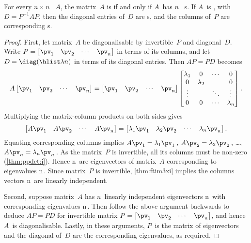 \begin{theorem} \label{thm:gendiag} 
For every \(n\times n\) ~\(A\), the matrix~\(A\) is  if and only if \(A\)~has \(n\)~ s.  
If \(A\)~is , with  \(D=P^{-1}AP\), then  the diagonal entries of~\(D\) are s, and the columns of~\(P\) are corresponding s.
\end{theorem}
\begin{proof} 
First, let matrix~\(A\) be diagonalisable by invertible~\(P\) and diagonal~\(D\).
Write \(P=\begin{bmatrix} \pv_1&\pv_2&\cdots&\pv_n \end{bmatrix}\) in terms of its columns, and let \(D=\diag(\hlist\lambda n)\) in terms of its diagonal entries.
Then \(AP=PD\) becomes
\begin{equation*}
A\begin{bmatrix} \pv_1&\pv_2&\cdots&\pv_n \end{bmatrix}
=\begin{bmatrix} \pv_1&\pv_2&\cdots&\pv_n \end{bmatrix}
\begin{bmatrix} \lambda_1&0&\cdots&0\\
0&\lambda_2&&0\\
\vdots&&\ddots&\vdots\\
0&0&\cdots&\lambda_n \end{bmatrix}.
\end{equation*}
Multiplying the matrix-column products on both sides gives
\begin{equation*}
\begin{bmatrix} A\pv_1&A\pv_2&\cdots&A\pv_n \end{bmatrix}
=\begin{bmatrix} \lambda_1\pv_1& \lambda_2\pv_2&\cdots& \lambda_n\pv_n \end{bmatrix}.
\end{equation*}
Equating corresponding columns implies \(A\pv_1=\lambda_1\pv_1\)\,, \(A\pv_2=\lambda_2\pv_2\)\,, \ldots, \(A\pv_n=\lambda_n\pv_n\)\,.
As the matrix~\(P\) is invertible, all its columns must be non-zero (\autoref{thm:ppdet:i}).
Hence \hlist\pv n\ are eigenvectors of matrix~\(A\) corresponding to eigenvalues \hlist\lambda n\,.
Since matrix~\(P\) is invertible, \autoref{thm:ftim3xi} implies the columns vectors \hlist\pv n\ are linearly independent.

Second, suppose matrix~\(A\) has \(n\)~{linearly independent} {eigenvector}s \hlist\pv n\ with corresponding eigenvalues \hlist\lambda n\,.  
Then follow the above argument backwards to deduce \(AP=PD\) for invertible matrix \(P=\begin{bmatrix} \pv_1&\pv_2&\cdots&\pv_n \end{bmatrix}\), and hence \(A\)~is diagonalisable.
Lastly, in these arguments, \(P\)~is the matrix of eigenvectors and the diagonal of~\(D\) are the corresponding eigenvalues, as required.
\end{proof}


